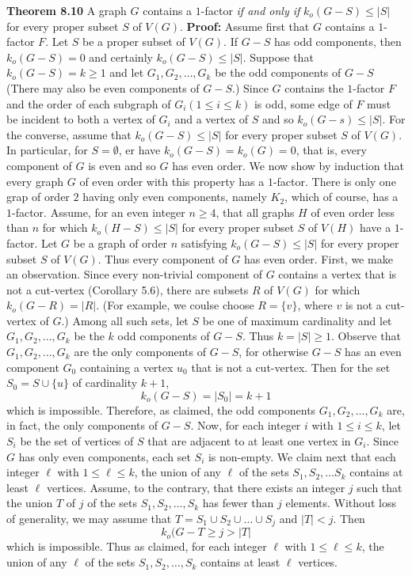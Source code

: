 \nopagenumbers
{\bf Theorem 8.10}
\vskip 6pt
A graph $G$ contains a $1$-factor {\it if and only if} $k_o(G-S) \leq |S|$ for every proper subset $S$ of $V(G)$.
\vskip 10pt
{\bf Proof:}
\vskip 6pt
Assume first that $G$ contains a $1$-factor $F$. Let $S$ be a proper subset of $V(G)$. If $G-S$ has odd components, then $k_o(G-S)=0$ and certainly $k_o(G-S) \leq |S|$. Suppose that $k_o(G-S)=k \geq 1$ and let $G_1,G_2, \ldots,G_k$ be the odd components of $G-S$ (There may also be even components of $G-S$.) Since $G$ contains the $1$-factor $F$ and the order of each subgraph of $G_i(1 \leq i \leq k)$ is odd, some edge of $F$ must be incident to both a vertex of $G_i$ and a vertex of $S$ and so $k_o(G-s) \leq |S|$.
\vskip 1mm
For the converse, assume that $k_o(G-S) \leq |S|$ for every proper subset $S$ of $V(G)$. In particular, for $S= \emptyset$, er have $k_o(G-S)=k_o(G)=0$, that is, every component of $G$ is even and so $G$ has even order. We now show by induction that every graph $G$ of even order with this property has a $1$-factor. There is only one grap of order $2$ having only even components, namely $K_2$, which of course, has a $1$-factor. Assume, for an even integer $n \geq 4$, that all graphs $H$ of even order less than $n$ for which $k_o(H-S) \leq |S|$ for every proper subset $S$ of $V(H)$ have a $1$-factor. Let $G$ be a graph of order $n$ satisfying $k_o(G-S) \leq |S|$ for every proper subset $S$ of $V(G)$. Thus every component of $G$ has even order.
\vskip 1mm
First, we make an observation. Since every non-trivial component of $G$ contains a vertex that is not a cut-vertex (Corollary 5.6), there are subsets $R$ of $V(G)$ for which $k_o(G-R)=|R|$. (For example, we coulse choose $R= \lbrace v \rbrace$, where $v$ is not a cut-vertex of $G$.) Among all such sets, let $S$ be one of maximum cardinality and let $G_1,G_2, \ldots , G_k$ be the $k$ odd components of $G-S$. Thus $k=|S| \geq 1$.
\vskip 1mm
Observe that $G_1,G_2, \ldots , G_k$ are the only components of $G-S$, for otherwise $G-S$ has an even component $G_0$ containing a vertex $u_0$ that is not a cut-vertex. Then for the set $S_0=S \cup \lbrace u \rbrace$ of cardinality $k+1$, $$k_o(G-S)=|S_0|=k+1$$ which is impossible. Therefore, as claimed, the odd components $G_1,G_2, \ldots , G_k$ are, in fact, the only components of $G-S$.
\vskip 1mm
Now, for each integer $i$ with $1 \leq i \leq k$, let $S_i$ be the set of vertices of $S$ that are adjacent to at least one vertex in $G_i$. Since $G$ has only even components, each set $S_i$ is non-empty. We claim next that each integer $\ell$ with $1 \leq \ell \leq k$, the union of any $\ell$ of the sets $S_1,S_2, \ldots S_k$ contains at least $\ell$ vertices. Assume, to the contrary, that there exists an integer $j$ such that the union $T$ of $j$ of the sets $S_1,S_2, \ldots ,S_k$ has fewer than $j$ elements. Without loss of generality, we may assume that $T=S_1 \cup S_2 \cup \ldots \cup S_j$ and $|T|<j$. Then $$k_o(G-T \geq j > |T|$$ which is impossible. Thus as claimed, for each integer $\ell$ with $1 \leq \ell \leq k$, the union of any $\ell$ of the sets $S_1,S_2, \ldots , S_k$ contains at least $\ell$ vertices.
